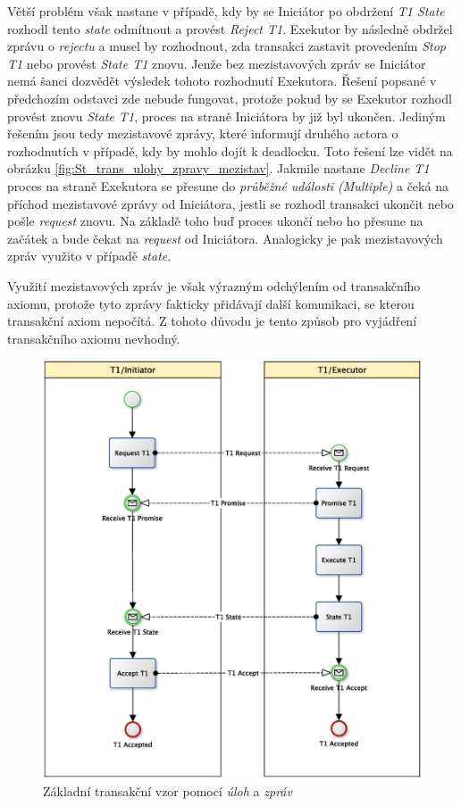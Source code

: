 \documentclass[]{article}
\begin{document}
Větší problém však nastane v případě, kdy by se Iniciátor po obdržení \textit{T1 State} rozhodl tento \textit{state} odmítnout a provést \textit{Reject T1}. Exekutor by následně obdržel zprávu o \textit{rejectu} a musel by rozhodnout, zda transakci zastavit provedením \textit{Stop T1} nebo provést \textit{State T1} znovu. Jenže bez mezistavových zpráv se Iniciátor nemá šanci dozvědět výsledek tohoto rozhodnutí Exekutora. Řešení popsané v předchozím odstavci zde nebude fungovat, protože pokud by se Exekutor rozhodl provést znovu \textit{State T1}, proces na straně Iniciátora by již byl ukončen. Jediným řešením jsou tedy mezistavové zprávy, které informují druhého actora o rozhodnutích v případě, kdy by mohlo dojít k deadlocku. Toto řešení lze vidět na obrázku \ref{fig:St_trans_ulohy_zpravy_mezistav}. Jakmile nastane \textit{Decline T1} proces na straně Exekutora se přesune do\textit{ průběžné události (Multiple)} a čeká na příchod mezistavové zprávy od Iniciátora, jestli se rozhodl transakci ukončit nebo pošle \textit{request} znovu. Na základě toho buď proces ukončí nebo ho přesune na začátek a bude čekat na \textit{request} od Iniciátora. Analogicky je pak mezistavových zpráv využito v případě \textit{state}.

Využití mezistavových zpráv je však výrazným odchýlením od transakčního axiomu, protože tyto zprávy fakticky přidávají další komunikaci, se kterou transakční axiom nepočítá. Z tohoto důvodu je tento způsob pro vyjádření transakčního axiomu nevhodný. 

\begin{figure}[H]\centering
\includegraphics[width=\textwidth,height=\textheight,keepaspectratio]{obrazky/transaction-basic-messages}
\caption{Základní transakční vzor pomocí \textit{úloh} a \textit{zpráv}}
\label{fig:Zk_trans_ulohy_zpravy}
\end{figure}
\end{document}
